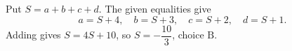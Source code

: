 Put $S=a+b+c+d$. The given equalities give
\[
a=S+4,\quad b=S+3,\quad c=S+2,\quad d=S+1.
\]
Adding gives $S=4S+10$, so $\boxed{S=-\dfrac{10}{3}}$, choice $\boxed{\text{B}}$.
